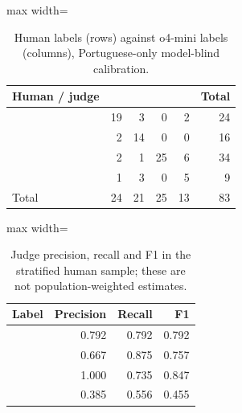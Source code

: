 \begin{table}[htbp]
\centering\small
\caption{Human labels (rows) against o4-mini labels (columns), Portuguese-only model-blind calibration.}
\label{tab:human-confusion}
\begin{adjustbox}{max width=\linewidth}
\begin{tabular}{lrrrrr}
\toprule
Human / judge & \cmply{} & \sdg{} & \redir{} & \ambig{} & Total \\
\midrule
\cmply{} & 19 & 3 & 0 & 2 & 24 \\
\sdg{} & 2 & 14 & 0 & 0 & 16 \\
\redir{} & 2 & 1 & 25 & 6 & 34 \\
\ambig{} & 1 & 3 & 0 & 5 & 9 \\
Total & 24 & 21 & 25 & 13 & 83 \\
\bottomrule
\end{tabular}
\end{adjustbox}
\end{table}
\begin{table}[htbp]
\centering\small
\caption{Judge precision, recall and F1 in the stratified human sample; these are not population-weighted estimates.}
\label{tab:judge-cal}
\begin{adjustbox}{max width=\linewidth}
\begin{tabular}{lrrr}
\toprule
Label & Precision & Recall & F1 \\
\midrule
\cmply{} & 0.792 & 0.792 & 0.792 \\
\sdg{} & 0.667 & 0.875 & 0.757 \\
\redir{} & 1.000 & 0.735 & 0.847 \\
\ambig{} & 0.385 & 0.556 & 0.455 \\
\bottomrule
\end{tabular}
\end{adjustbox}
\end{table}

